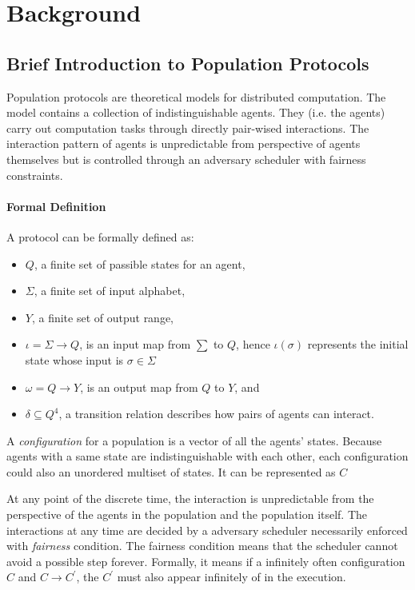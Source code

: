 \section{Background}
\subsection{Brief Introduction to Population Protocols \cite{AspnesR2007, MCS11}}
\par
Population protocols are theoretical models for distributed computation.
The model contains a collection of indistinguishable agents.
They (i.e. the agents) carry out computation tasks through directly pair-wised interactions.
The interaction pattern of agents is unpredictable from perspective of agents themselves
but is controlled through an adversary scheduler with fairness constraints.
\paragraph{Formal Definition}
A protocol can be formally defined as:
\begin{itemize}
  \item $Q$, a finite set of passible states for an agent,
  \item $\Sigma$, a finite set of input alphabet,
  \item $Y$, a finite set of output range,
  \item $\iota = \Sigma \to Q $, is an input map from $\sum$ to $Q$, hence $\iota(\sigma)$ represents the initial state whose input is $\sigma \in \Sigma$
  \item $\omega = Q \to Y $, is an output map from $Q$ to $Y$, and
  \item $\delta \subseteq Q^{4}$, a transition relation describes how pairs of agents can interact.
\end{itemize}
\par
A \textit{configuration} for a population is a vector of all the agents' states.
Because agents with a same state are indistinguishable with each other, each configuration
could also an unordered multiset of states. It can be represented as $C$
\par
\label{IntroToPPFairScheduler}
At any point of the discrete time, the interaction is unpredictable from the perspective of the agents
in the population and the population itself. The interactions at any time are decided
by a adversary scheduler necessarily enforced with \textit{fairness} condition.
The fairness condition means that the scheduler cannot avoid a possible step forever.
Formally, it means if a infinitely often configuration $C$ and $C \to C^{'}$,
the $C^{'}$ must also appear infinitely of in the execution.


